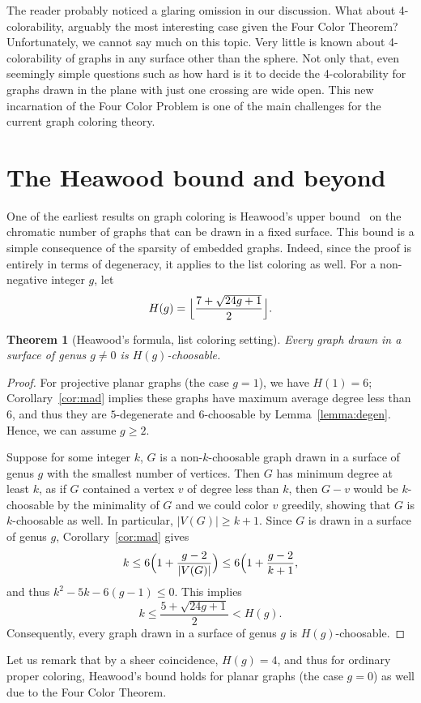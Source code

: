 \documentclass[12pt,twoside,openright,a4paper]{book}
\newtheorem{theorem}{Theorem}[chapter]
\begin{document}
The reader probably noticed a glaring omission in our discussion.  What about 4-colorability, arguably the most interesting case given the Four Color Theorem?
Unfortunately, we cannot say much on this topic.  Very little is known about 4-colorability of graphs in any surface other than the sphere.  Not only that,
even seemingly simple questions such as how hard is it to decide the 4-colorability for graphs drawn in the plane with just one crossing are wide open.
This new incarnation of the Four Color Problem is one of the main challenges for the current graph coloring theory.

\section{The Heawood bound and beyond}\label{sec:heawood}

One of the earliest results on graph coloring is Heawood's upper bound~\cite{heawood} on the chromatic number
of graphs that can be drawn in a fixed surface.  This bound is a simple consequence of the sparsity of embedded graphs.
Indeed, since the proof is entirely in terms of degeneracy, it applies to the list coloring as well.
For a non-negative integer $g$,
let $$H(g)=\Bigl\lfloor\frac{7+\sqrt{24g+1}}{2}\Bigl\rfloor.$$
\begin{theorem}[Heawood's formula, list coloring setting]\label{thm:listheawood}
Every graph drawn in a surface of genus $g\neq 0$ is $H(g)$-choosable.
\end{theorem}
\begin{proof}
For projective planar graphs (the case $g=1$), we have $H(1)=6$; Corollary~\ref{cor:mad} implies these graphs have maximum
average degree less than $6$, and thus they are $5$-degenerate and $6$-choosable by Lemma~\ref{lemma:degen}.
Hence, we can assume $g\ge 2$.

Suppose for some integer $k$, $G$ is a non-$k$-choosable graph drawn in a surface of genus $g$ with the smallest number of vertices.
Then $G$ has minimum degree at least $k$, as if $G$ contained a vertex $v$ of degree less than $k$, then $G-v$ would be $k$-choosable
by the minimality of $G$ and we could color $v$ greedily, showing that $G$ is $k$-choosable as well.  In particular, $|V(G)|\ge k+1$.
Since $G$ is drawn in a surface of genus $g$, Corollary~\ref{cor:mad} gives
$$k\le 6\Bigl(1+\frac{g-2}{|V(G)|}\Bigr)\le 6\Bigl(1+\frac{g-2}{k+1},$$
and thus $k^2-5k-6(g-1)\le 0$.  This implies $$k\le \frac{5+\sqrt{24g+1}}{2}<H(g).$$
Consequently, every graph drawn in a surface of genus $g$ is $H(g)$-choosable.
\end{proof}
Let us remark that by a sheer coincidence, $H(g)=4$, and thus for ordinary proper coloring, Heawood's bound holds for planar graphs (the case $g=0$)
as well due to the Four Color Theorem.
\end{document}
